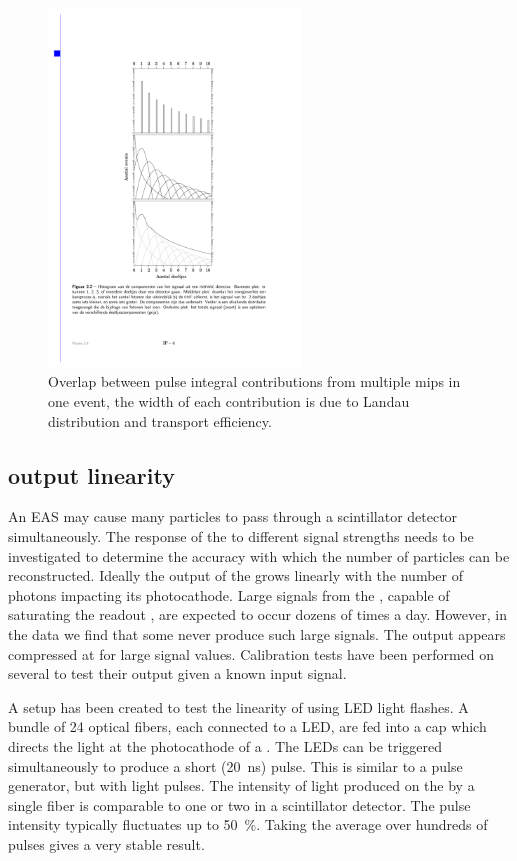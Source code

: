 \begin{figure}
    \centering
    \includegraphics[width=0.6\textwidth]
                    {plots/station/ph_histogram_contrib}
    \caption{Overlap between pulse integral contributions from multiple mips in one event, the width of each contribution is due to Landau distribution and transport efficiency.}
    \label{fig:ph_histogram_contrib}
\end{figure}


\subsection{\pmt output linearity}
\label{sub:pmt_linearity}

An EAS may cause many particles to pass through a scintillator detector simultaneously. The response of the \pmt to different signal strengths needs to be investigated to determine the accuracy with which the number of particles can be reconstructed. Ideally the output of the \pmt grows linearly with the number of photons impacting its photocathode. Large signals from the \pmt, capable of saturating the readout \adcs, are expected to occur dozens of times a day. However, in the data we find that some \pmts never produce such large signals. The output appears compressed at for large signal values. Calibration tests have been performed on several \pmts to test their output given a known input signal.

A setup has been created to test the linearity of \pmts using LED light flashes. A bundle of 24 optical fibers, each connected to a LED, are fed into a cap which directs the light at the photocathode of a \pmt. The LEDs can be triggered simultaneously to produce a short (\SI{20}{\ns}) pulse. This is similar to a pulse generator, but with light pulses. The intensity of light produced on the \pmt by a single fiber is comparable to one or two \mip in a scintillator detector. The \pmt pulse intensity typically fluctuates up to \SI{50}{\percent}. Taking the average over hundreds of pulses gives a very stable result.

